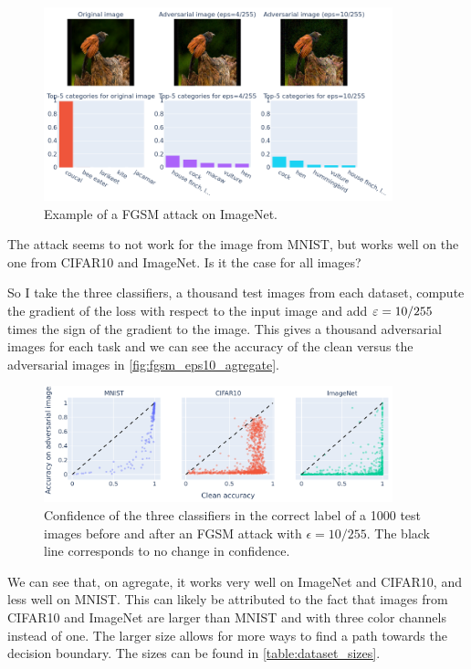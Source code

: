 \documentclass[]{scrarticle}
\begin{document}
\begin{figure}[H]
  \centering
  \includegraphics[width=0.9\textwidth]{../images/fgsm_example_ImageNet.png}
  \caption{Example of a FGSM attack on ImageNet.}
  \label{fig:fgsm_examples_imagenet}
\end{figure}

The attack seems to not work for the image from MNIST, but works well
on the one from CIFAR10 and ImageNet.
Is it the case for all images?

So I take the three classifiers, a thousand test images from each dataset,
compute the gradient of the loss with respect to the input image
and add $\varepsilon = 10 / 255$ times the sign of the gradient to the image.
This gives a thousand adversarial images for each task and
we can see the accuracy of the clean versus the adversarial images
in \autoref{fig:fgsm_eps10_agregate}.

\begin{figure}[H]
  \centering
  \includegraphics[width=0.9\textwidth]{../images/fgsm_strength.png}
  \caption{Confidence of the three classifiers in the correct label of
    a 1000 test images before and after an FGSM attack with $\epsilon = 10 / 255$.
    The black line corresponds to no change in confidence.
  }
  \label{fig:fgsm_eps10_agregate}
\end{figure}

We can see that, on agregate, it works very well on ImageNet and CIFAR10,
and less well on MNIST. This can likely be attributed to the fact that
images from CIFAR10 and ImageNet are larger than MNIST and with three
color channels instead of one. The larger size allows for more ways to
find a path towards the decision boundary.
The sizes can be found in \autoref{table:dataset_sizes}.
\end{document}
